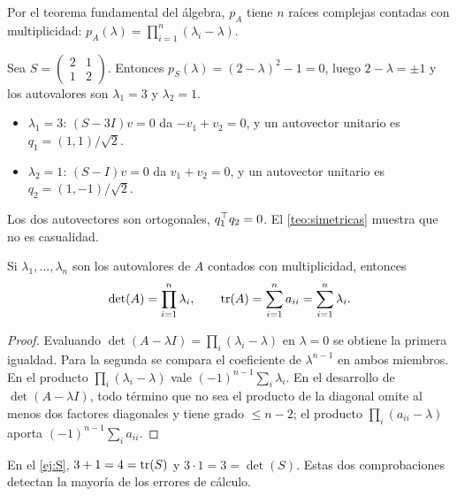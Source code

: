 Por el teorema fundamental del álgebra, $p_A$ tiene $n$ raíces complejas contadas con multiplicidad: $p_A(\lambda)=\prod_{i=1}^{n}(\lambda_i-\lambda)$.

\begin{ejemplo}\label{ej:S}
Sea $S=\begin{pmatrix}2&1\\1&2\end{pmatrix}$. Entonces $p_S(\lambda)=(2-\lambda)^{2}-1=0$, luego $2-\lambda=\pm 1$ y los autovalores son $\lambda_1=3$ y $\lambda_2=1$.
\begin{itemize}
  \item $\lambda_1=3$: $(S-3I)v=0$ da $-v_1+v_2=0$, y un autovector unitario es $q_1=(1,1)/\sqrt{2}$.
  \item $\lambda_2=1$: $(S-I)v=0$ da $v_1+v_2=0$, y un autovector unitario es $q_2=(1,-1)/\sqrt{2}$.
\end{itemize}
Los dos autovectores son ortogonales, $q_1^{\top} q_2=0$. El \cref{teo:simetricas} muestra que no es casualidad.
\end{ejemplo}

\begin{proposicion}\label{prop:traza-det}
Si $\lambda_1,\dots,\lambda_n$ son los autovalores de $A$ contados con multiplicidad, entonces
\[
\det(A)=\prod_{i=1}^{n}\lambda_i,\qquad \operatorname{tr}(A)=\sum_{i=1}^{n}a_{ii}=\sum_{i=1}^{n}\lambda_i.
\]
\end{proposicion}

\begin{proof}
Evaluando $\det(A-\lambda I)=\prod_i(\lambda_i-\lambda)$ en $\lambda=0$ se obtiene la primera igualdad. Para la segunda se compara el coeficiente de $\lambda^{n-1}$ en ambos miembros. En el producto $\prod_i(\lambda_i-\lambda)$ vale $(-1)^{n-1}\sum_i\lambda_i$. En el desarrollo de $\det(A-\lambda I)$, todo término que no sea el producto de la diagonal omite al menos dos factores diagonales y tiene grado $\le n-2$; el producto $\prod_i(a_{ii}-\lambda)$ aporta $(-1)^{n-1}\sum_i a_{ii}$.
\end{proof}

En el \cref{ej:S}, $3+1=4=\operatorname{tr}(S)$ y $3\cdot 1=3=\det(S)$. Estas dos comprobaciones detectan la mayoría de los errores de cálculo.

